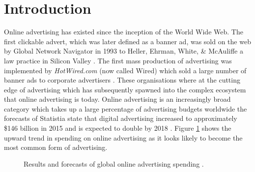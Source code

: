 \documentclass[12pt]{article}
\begin{document}
\section{Introduction}
Online advertising has existed since the inception of the World Wide Web. The first clickable advert, which was later defined as a banner ad, was sold on the web by Global Network Navigator in 1993 to Heller, Ehrman, White, \& McAuliffe a law practice in Silicon Valley \parencite{oreilly}. The first mass production of advertising was implemented by \textit{HotWired.com} (now called Wired) which sold a large number of banner ads to corporate advertisers \parencite{firstAd}. These organisations where at the cutting edge of advertising which has subsequently spawned into the complex ecosystem that online advertising is today. Online advertising is an increasingly broad category which takes up a large percentage of advertising budgets worldwide the forecasts of Statistia state that digital advertising increased to approximately \$146 billion in 2015 and is expected to double by 2018 \parencite{Statistia}. Figure \ref{fig:M1} shows the upward trend in spending on online advertising as it looks likely to become the most common form of advertising.   \\

\begin{figure} [H]
    \centering
    \caption{Results and forecasts of global online advertising spending \parencite{Statistia}.} \label{fig:M1}
\end{figure}
\end{document}
